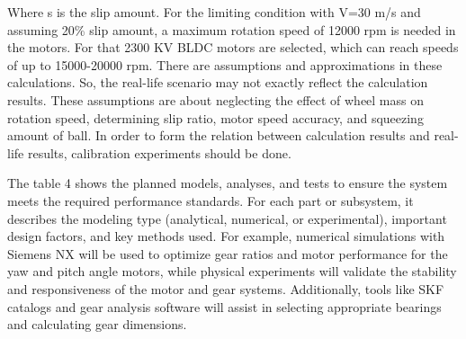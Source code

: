 \documentclass[12pt]{article}
\begin{document}
Where s is the slip amount.
For the limiting condition with V=30 m/s and assuming 20\% slip amount, a maximum rotation speed of 12000 rpm is needed in the motors. For that 2300 KV BLDC motors are selected, which can reach speeds of up to 15000-20000 rpm.
There are assumptions and approximations in these calculations. So, the real-life scenario may not exactly reflect the calculation results. These assumptions are about neglecting the effect of wheel mass on rotation speed, determining slip ratio, motor speed accuracy, and squeezing amount of ball. In order to form the relation between calculation results and real-life results, calibration experiments should be done.

The table 4 shows the planned models, analyses, and tests to ensure the system meets the required performance standards. For each part or subsystem, it describes the modeling type (analytical, numerical, or experimental), important design factors, and key methods used. For example, numerical simulations with Siemens NX will be used to optimize gear ratios and motor performance for the yaw and pitch angle motors, while physical experiments will validate the stability and responsiveness of the motor and gear systems. Additionally, tools like SKF catalogs and gear analysis software will assist in selecting appropriate bearings and calculating gear dimensions.
\end{document}
